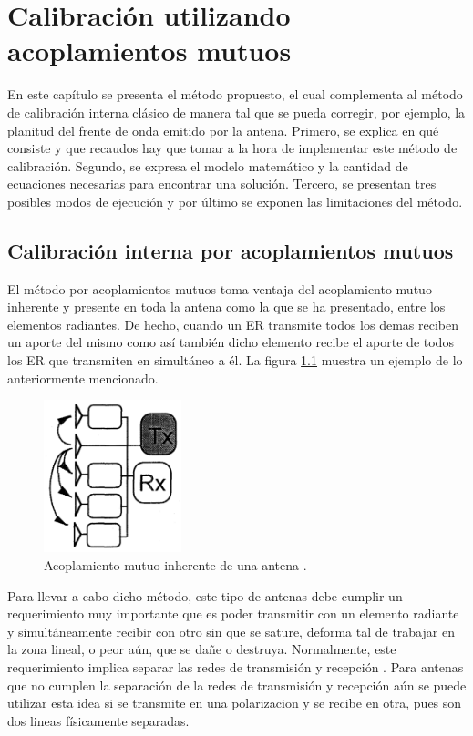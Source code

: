 \chapter{Calibración utilizando acoplamientos mutuos}
\label{ch:mutualCalibration}

En este capítulo se presenta el método propuesto, el cual complementa al método de calibración interna clásico de manera tal
que se pueda corregir, por ejemplo, la planitud del frente de onda emitido por la antena. Primero, se explica en qué consiste
y que recaudos hay que tomar a la hora de implementar este método de calibración. Segundo, se expresa el modelo matemático y
la cantidad de ecuaciones necesarias para encontrar una solución. Tercero, se presentan tres posibles modos de ejecución y por
último se exponen las limitaciones del método.  


\section{Calibración interna por acoplamientos mutuos}

El método por acoplamientos mutuos toma ventaja del acoplamiento mutuo inherente y presente en toda la antena como la que se ha
presentado, entre los elementos radiantes. De hecho, cuando un ER transmite todos los demas reciben un aporte del mismo como así
también dicho elemento recibe el aporte de todos los ER que transmiten en simultáneo a él. La figura \ref{fig:mutualCoupling1}
muestra un ejemplo de lo anteriormente mencionado.

\begin{figure}[H]
 \centering
 \includegraphics[width=4cm]{gfx/mutualCoupling1.png}
 \caption{Acoplamiento mutuo inherente de una antena \cite{Hara1997}.}
 \label{fig:mutualCoupling1}
\end{figure}

Para llevar a cabo dicho método, este tipo de antenas debe cumplir un requerimiento muy importante que es poder transmitir con
un elemento radiante y simultáneamente recibir con otro sin que se sature, deforma tal de trabajar en la zona lineal, o peor
aún, que se dañe o destruya. Normalmente, este requerimiento implica separar las redes de transmisión y recepción
\cite{Gao2001}. Para antenas que no cumplen la separación de la redes de transmisión y recepción aún se puede utilizar esta
idea si se transmite en una polarizacion y se recibe en otra, pues son dos lineas físicamente separadas.

